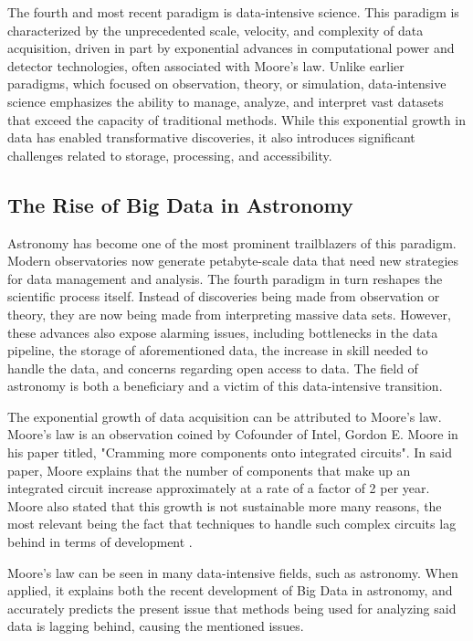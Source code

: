 \documentclass[preprint,linenumbers, longauthor]{aastex631}
\begin{document}
The fourth and most recent paradigm is data-intensive science. 
This paradigm is characterized by the unprecedented scale, velocity, and complexity of data acquisition, driven in part by exponential advances in computational power and detector technologies, often associated with Moore's law. 
Unlike earlier paradigms, which focused on observation, theory, or simulation, data-intensive science emphasizes the ability to manage, analyze, and interpret vast datasets that exceed the capacity of traditional methods. 
While this exponential growth in data has enabled transformative discoveries, it also introduces significant challenges related to storage, processing, and accessibility. 

\subsection{The Rise of Big Data in Astronomy}
Astronomy has become one of the most prominent trailblazers of this paradigm. Modern observatories now generate petabyte-scale data that need new strategies for data management and analysis. 
The fourth paradigm in turn reshapes the scientific process itself. Instead of discoveries being made from observation or theory, they are now being made from interpreting massive data sets. 
However, these advances also expose alarming issues, including bottlenecks in the data pipeline, the storage of aforementioned data, the increase in skill needed to handle the data, and concerns regarding open access to data. 
The field of astronomy is both a beneficiary and a victim of this data-intensive transition. 

The exponential growth of data acquisition can be attributed to Moore's law. Moore's law is an observation coined by Cofounder of Intel, Gordon E. Moore in his paper titled, "Cramming more components onto integrated circuits". 
In said paper, Moore explains that the number of components that make up an integrated circuit increase approximately at a rate of a factor of 2 per year.
Moore also stated that this growth is not sustainable more many reasons, the most relevant being the fact that techniques to handle such complex circuits lag behind in terms of development \cite{mooreCrammingMoreComponents2006}.

Moore's law can be seen in many data-intensive fields, such as astronomy.
When applied, it explains both the recent development of Big Data in astronomy, and accurately predicts the present issue that methods being used for analyzing said data is lagging behind, causing the mentioned issues.
\end{document}
